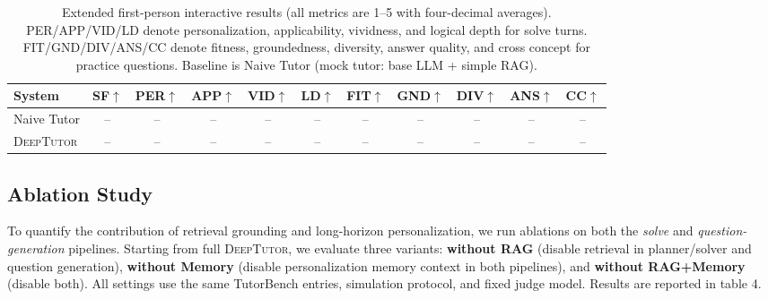 \begin{table}[t]
\centering
\small
\setlength{\tabcolsep}{4.5pt}
\begin{tabular}{lcccccccccc}
\toprule
\textbf{System} &
\textbf{SF}$\uparrow$ &
\textbf{PER}$\uparrow$ &
\textbf{APP}$\uparrow$ &
\textbf{VID}$\uparrow$ &
\textbf{LD}$\uparrow$ &
\textbf{FIT}$\uparrow$ &
\textbf{GND}$\uparrow$ &
\textbf{DIV}$\uparrow$ &
\textbf{ANS}$\uparrow$ &
\textbf{CC}$\uparrow$ \\
\midrule
Naive Tutor       & -- & -- & -- & -- & -- & -- & -- & -- & -- & -- \\
\textsc{DeepTutor}& -- & -- & -- & -- & -- & -- & -- & -- & -- & -- \\
\bottomrule
\end{tabular}
\caption{Extended first-person interactive results (all metrics are 1--5 with four-decimal averages). PER/APP/VID/LD denote personalization, applicability, vividness, and logical depth for solve turns. FIT/GND/DIV/ANS/CC denote fitness, groundedness, diversity, answer quality, and cross concept for practice questions. Baseline is Naive Tutor (mock tutor: base LLM + simple RAG).}
\label{tab:interactive_results_full}
\end{table}


\subsection{Ablation Study}
\label{sec:ablation_rag_memory}

To quantify the contribution of retrieval grounding and long-horizon personalization, we run ablations on both the \textit{solve} and \textit{question-generation} pipelines.
Starting from full \textsc{DeepTutor}, we evaluate three variants:
\textbf{without RAG} (disable retrieval in planner/solver and question generation),
\textbf{without Memory} (disable personalization memory context in both pipelines),
and \textbf{without RAG+Memory} (disable both).
All settings use the same TutorBench entries, simulation protocol, and fixed judge model. Results are reported in table 4.


